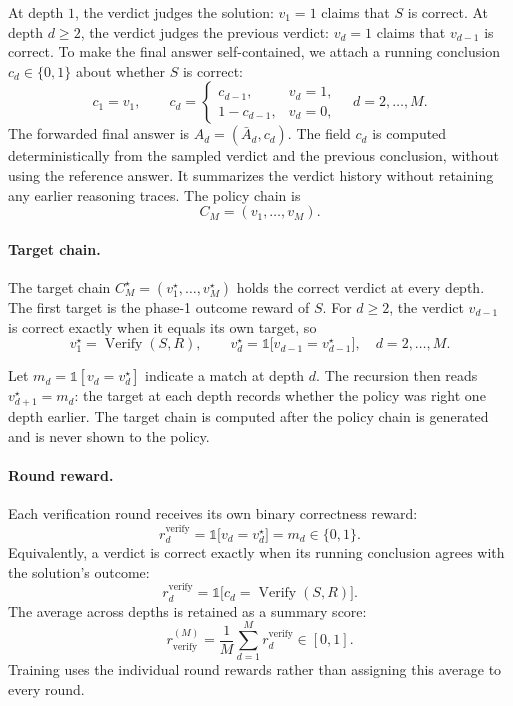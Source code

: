 \documentclass[11pt]{article}
\theoremstyle{definition}
\theoremstyle{plain}
\begin{document}
At depth $1$, the verdict judges the solution: $v_1=1$ claims that
$S$ is correct. At depth $d\ge2$, the verdict judges the previous
verdict: $v_d=1$ claims that $v_{d-1}$ is correct.
To make the final answer self-contained, we attach a running
conclusion $c_d\in\{0,1\}$ about whether $S$ is correct:
\begin{equation}
c_1=v_1,
\qquad
c_d=
\begin{cases}
c_{d-1}, & v_d=1,\\
1-c_{d-1}, & v_d=0,
\end{cases}
\quad d=2,\ldots,M.
\end{equation}
The forwarded final answer is $A_d=(\bar A_d,c_d)$.
The field $c_d$ is computed deterministically from the sampled
verdict and the previous conclusion, without using the reference
answer. It summarizes the verdict history without retaining any
earlier reasoning traces. The policy chain is
\begin{equation}
C_M=(v_1,\ldots,v_M).
\end{equation}


\paragraph{Target chain.}
The target chain $C_M^\star=(v_1^\star,\ldots,v_M^\star)$ holds the correct verdict at every depth. The first target is the phase-1 outcome reward of $S$. For $d\ge2$, the verdict $v_{d-1}$ is correct exactly when it equals its own target, so
\begin{equation}
v_1^\star=\operatorname{Verify}(S,R),
\qquad
v_d^\star=\mathds{1}\big[v_{d-1}=v_{d-1}^\star\big],
\quad d=2,\ldots,M.
\end{equation}

Let $m_d=\mathds{1}[v_d=v_d^\star]$ indicate a match at depth $d$. The recursion then reads $v_{d+1}^\star=m_d$: the target at each depth records whether the policy was right one depth earlier. The target chain is computed after the policy chain is generated and is never shown to the policy.


\paragraph{Round reward.}
Each verification round receives its own binary correctness reward:
\begin{equation}
r_d^{\mathrm{verify}}
=\mathds{1}\big[v_d=v_d^\star\big]
=m_d\in\{0,1\}.
\end{equation}
Equivalently, a verdict is correct exactly when its running
conclusion agrees with the solution's outcome:
\begin{equation}
r_d^{\mathrm{verify}}
=\mathds{1}\big[c_d=\operatorname{Verify}(S,R)\big].
\end{equation}
The average across depths is retained as a summary score:
\begin{equation}
r_{\mathrm{verify}}^{(M)}
=\frac{1}{M}\sum_{d=1}^{M}r_d^{\mathrm{verify}}\in[0,1].
\end{equation}
Training uses the individual round rewards rather than assigning
this average to every round.
\end{document}
